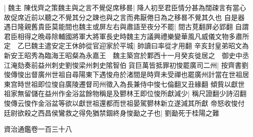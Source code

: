 |{
	魏主}
陳伐齊之策魏主與之言不覺促席移晷|{
	降人初至君臣情分甚為闊疎言有當心故促席近前以聽之不覺其分之踈也與之言而弗厭倦日為之移晷不覺其久也}
自是器遇日隆親舊貴臣莫能間也魏主或屏左右與肅語至夜分不罷|{
	間古莧翻屏必郢翻}
自謂君臣相得之晩尋除輔國將軍大將軍長史時魏主方議興禮樂變華風凡威儀文物多肅所定　乙巳魏主遣安定王休帥從官迎家於平城|{
	帥讀曰率從才用翻}
辛亥封皇弟昭文為新安王昭秀為臨海王昭粲為永嘉王　魏主築宫於鄴西十一月癸亥徙居之　御史中丞江淹劾奏前益州刺史劉悛梁州刺史隂智伯貨巨萬皆抵罪初悛罷廣司二州|{
	按齊書劉悛傳悛出督廣州世祖自尋陽東下遇悛舟於渚間是時齊未受禪也罷廣州計當在世祖居東宫時世祖即位悛自廣陵遷督司州徵入為長兼侍中悛七倫翻又丑緣翻}
傾貲以獻世祖家無留儲在益州作金浴盆餘物稱是及鬰林王即位悛所獻減少|{
	稱尺證翻少詩沼翻悛傳云悛作金浴盆等欲以獻世祖還都而世祖晏駕鬰林新立遂減其所獻}
帝怒收悛付廷尉欲殺之西昌侯鸞救之得免猶禁錮終身悛勔之子也|{
	劉勔死于桂陽之難}


資治通鑑卷一百三十八
